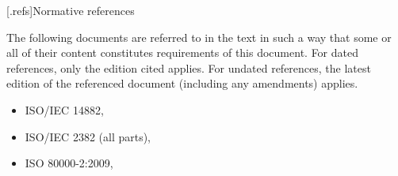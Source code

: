 
[\ioaudio.refs]{Normative references}

\pnum
{}%
The following documents are referred to in the text in such a way that some or all of their content constitutes requirements of this document. For dated references, only the edition cited applies. For undated references, the latest edition of the referenced document (including any amendments) applies.

\begin{itemize}
\item ISO/IEC 14882, 
\item ISO/IEC 2382 (all parts), 
\item ISO 80000-2:2009, 
\end{itemize}
